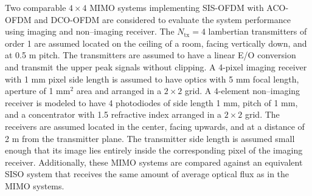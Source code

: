 Two comparable $4\times 4$ MIMO systems implementing SIS-OFDM with ACO-OFDM and DCO-OFDM are considered to evaluate the system performance using imaging and non--imaging receiver. The $N_{\text{tx}}=4$ lambertian transmitters of order 1 are assumed located on the ceiling of a room, facing vertically down, and at 0.5 m pitch. The transmitters are assumed to have a linear E/O conversion and transmit the upper peak signals without clipping. A 4-pixel imaging receiver with 1 mm pixel side length is assumed to have optics with 5 mm focal length, aperture of 1 mm$^2$ area and arranged in a $2\times 2$ grid. A 4-element non--imaging receiver is modeled to have 4 photodiodes of side length 1 mm, pitch of 1 mm, and a concentrator with 1.5 refractive index arranged in a $2\times 2$ grid. The receivers are assumed located in the center, facing upwards, and at a distance of 2 m from the transmitter plane. The transmitter side length is assumed small enough that its image lies entirely inside the corresponding pixel of the imaging receiver. Additionally, these MIMO systems are compared against an equivalent SISO system that receives the same amount of average optical flux as in the MIMO systems. 

